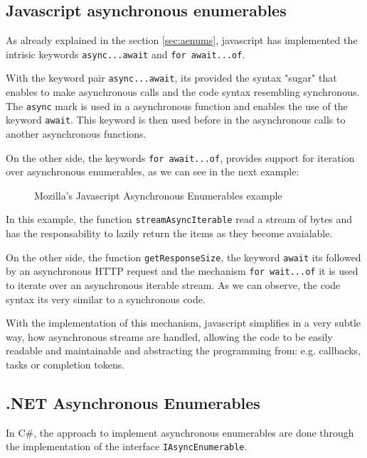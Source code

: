 \subsection{Javascript asynchronous enumerables}
\label{jsae}
As already explained in the section \ref{sec:aenums}, javascript has implemented the intrisic keywords \texttt{async...await} and \texttt{for await...of}.

With the keyword pair \texttt{async...await}, its provided the syntax "sugar" that enables to make asynchronous calls and the code syntax resembling synchronous. 
The \texttt{async} mark is used in a asynchronous function and enables the use of the keyword \texttt{await}. This keyword is then used before in the asynchronous calls to another asynchronous functions.

On the other side, the keywords \texttt{for await...of}, provides support for iteration over asynchronous enumerables, as we can see in the next example:

\clearpage
	\begin{figure}[H]
		\centering
		\caption{Mozilla's Javascript Asynchronous Enumerables example}
		\label{fig:enumex2}
	\end{figure}
\clearpage

In this example, the function \texttt{streamAsyncIterable} read a stream of bytes and has the responsability to lazily return the items as they become avaialable.

On the other side, the function \texttt{getResponseSize}, the keyword \texttt{await} its followed by an asynchronous HTTP request and the mechanism \texttt{for wait...of} it is used to iterate over an asynchronous iterable stream. As we can observe, the code syntax its very similar to a synchronous code. 

With the implementation of this mechanism, javascript simplifies in a very subtle way, how asynchronous streams are handled, allowing the code to be easily readable and maintainable and abstracting the programming from: e.g. callbacks, tasks or completion tokens.


\subsection{.NET Asynchronous Enumerables}
\label{csenums}

In C\#, the approach to implement asynchronous enumerables are done through the implementation of the interface \texttt{IAsyncEnumerable}.

